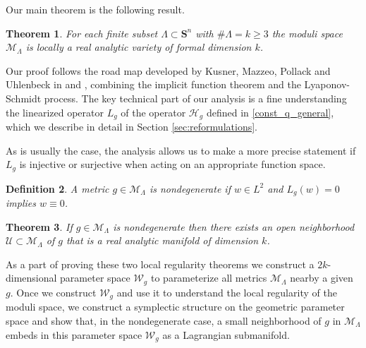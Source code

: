 \documentclass[reqno,11pt]{amsart}
\newtheorem{theorem}{Theorem}
\newtheorem{definition}[theorem]{Definition}
\theoremstyle{tttheorem}
\newcommand{\Ss}{\mathbf{S}}
\begin{document}
Our main theorem is the following result. 
\begin{theorem} \label{loc_struct_thm} 
For each finite subset $\Lambda \subset \Ss^n$ with $\# \Lambda =k\geq 3$ 
the moduli space $\mathcal{M}_\Lambda$ is locally a 
real analytic variety of formal dimension $k$.
\end{theorem}

Our proof follows the road map developed by Kusner, Mazzeo, Pollack 
and Uhlenbeck in \cite{KMP} and \cite{MPU}, combining the implicit function 
theorem and the Lyaponov-Schmidt process. The key technical 
part of our analysis is a fine understanding the linearized operator
$L_g$ of the operator $\mathcal H_g$ defined in \eqref{const_q_general}, which we describe in detail in Section \ref{sec:reformulations}.

As is usually the case, the analysis allows us to make a more precise 
statement if $L_g$ is injective or surjective when acting on an 
appropriate function space. 
\begin{definition} \label{nodegen_defn} 
A metric $g \in \mathcal{M}_\Lambda$ is nondegenerate if $w \in L^2$ and 
$L_g(w) = 0$ implies $w \equiv 0$. 
\end{definition}
\begin{theorem} \label{thm_nondegen_case}
If $g \in \mathcal{M}_\Lambda$ is nondegenerate %
then there exists an open neighborhood $\mathcal{U}\subset \mathcal{M}_\Lambda$
of $g$ that is a real analytic manifold of dimension $k$. 
\end{theorem} 
As a part of proving these two local regularity theorems we construct 
a $2k$-dimensional parameter space $\mathcal{W}_g$ to 
parameterize all metrics $\mathcal{M}_\Lambda$ nearby a given $g$. Once we 
construct $\mathcal{W}_g$ and use it to understand the local regularity of 
the moduli space, we 
construct a symplectic structure on the geometric parameter space and  
show that, in the nondegenerate case, a small neighborhood 
of $g$ in $\mathcal{M}_\Lambda$ embeds in this parameter space 
$\mathcal{W}_g$ as a Lagrangian submanifold.
\end{document}
